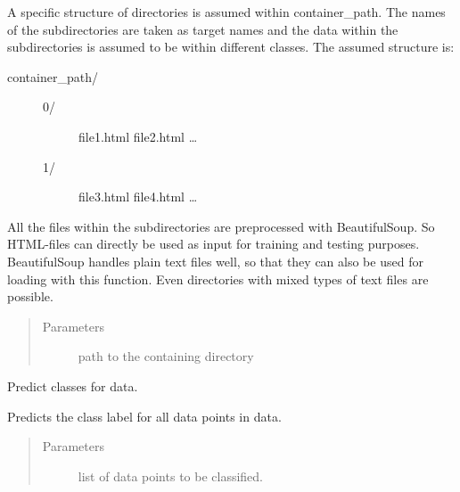 \documentclass[letterpaper,10pt,english]{sphinxmanual}
\begin{document}
\begin{fulllineitems}
\begin{fulllineitems}
A specific structure of directories is assumed within
container\_path. The names of the subdirectories are taken as
target names and the data within the subdirectories is assumed
to be within different classes. The assumed structure is:
\begin{description}
\item[{container\_path/}] \leavevmode\begin{description}
\item[{0/}] \leavevmode
file1.html
file2.html
…

\item[{1/}] \leavevmode
file3.html
file4.html
…

\end{description}

\end{description}

All the files within the subdirectories are preprocessed with
BeautifulSoup. So HTML-files can directly be used as input for
training and testing purposes. BeautifulSoup handles plain
text files well, so that they can also be used for loading
with this function. Even directories with mixed types of text
files are possible.
\begin{quote}\begin{description}
\item[{Parameters}] \leavevmode
{} \textendash{} path to the containing directory

\end{description}\end{quote}

\end{fulllineitems}


\begin{fulllineitems}
\label{\detokenize{api:classifier.Classifier.predict}}
Predict classes for data.

Predicts the class label for all data points in data.
\begin{quote}\begin{description}
\item[{Parameters}] \leavevmode
{} \textendash{} list of data points to be classified.

\end{description}\end{quote}


\end{fulllineitems}
\end{fulllineitems}
\end{document}
